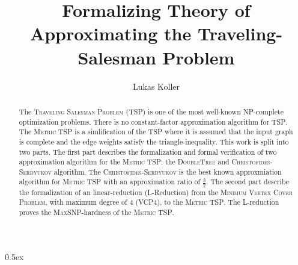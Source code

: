 \documentclass[11pt,a4paper]{article}
\begin{document}
\title{Formalizing Theory of Approximating the Traveling-Salesman Problem}
\author{Lukas Koller}
\maketitle

\begin{abstract}
  The \textsc{Traveling Salesman Problem} (\textsc{TSP}) is one of the most well-known \textsc{NP}-complete optimization problems. There is no constant-factor approximation algorithm for \textsc{TSP}. The \textsc{Metric TSP} is a simlification of the \textsc{TSP} where it is assumed that the input graph is complete and the edge weights satisfy the triangle-inequality. This work is split into two parts. The first part describes the formalization and formal verification of two approximation algorithm for the \textsc{Metric TSP}: the \textsc{DoubleTree} and \textsc{Christofides-Serdyukov} algorithm. The \textsc{Christofides-Serdyukov} is the best known approxmiation algorithm for \textsc{Metric TSP} with an approximation ratio of $\frac{3}{2}$. 
  The second part describe the formalization of an linear-reduction (L-Reduction) from the \textsc{Minimum Vertex Cover Problem}, with maximum degree of 4 (\textsc{VCP4}), to the \textsc{Metric TSP}. The L-reduction proves the \textsc{MaxSNP}-hardness of the \textsc{Metric TSP}.
\end{abstract}

\tableofcontents

\parindent 0pt\parskip 0.5ex





\end{document}
